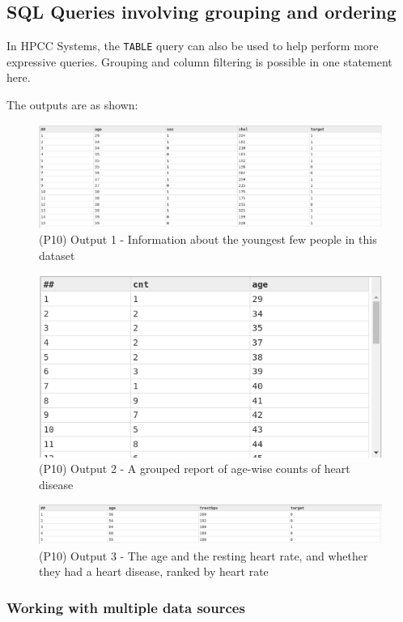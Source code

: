 \subsection{SQL Queries involving grouping and ordering}

In HPCC Systems, the \lstinline{TABLE} query can also be used to help perform more expressive queries. Grouping and column filtering is possible in one statement here.



The outputs are as shown:

\begin{figure}[h]
    \centering
    \includegraphics[width=.75\linewidth]{../output/63/1.png}
    \caption{(P10) Output 1 - Information about the youngest few people in this dataset}
\end{figure}

\begin{figure}[h]
    \centering
    \includegraphics[width=.5\linewidth]{../output/63/2}
    \caption{(P10) Output 2 - A grouped report of age-wise counts of heart disease}
\end{figure}
\begin{figure}[h]
    \centering
    \includegraphics[width=.75\linewidth]{../output/63/3}
    \caption{(P10) Output 3 - The age and the resting heart rate, and whether they had a heart disease, ranked by heart rate}
\end{figure}

\subsubsection{Working with multiple data sources}

